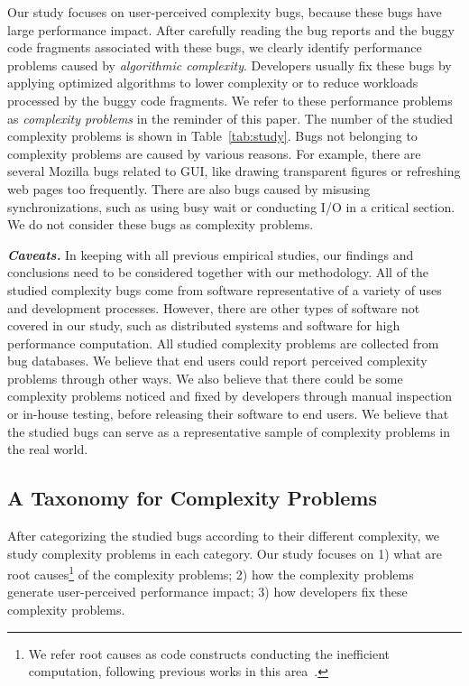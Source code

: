 Our study focuses on user-perceived complexity bugs, 
because these bugs have large performance impact.
After carefully reading the bug reports and the buggy code fragments 
associated with these bugs,
we clearly identify \ComBugs performance problems 
caused by {\textit{algorithmic complexity}}.
Developers usually fix these bugs by applying optimized algorithms to lower complexity
or to reduce workloads processed by the buggy code fragments. 
We refer to these performance problems as 
{\textit{complexity problems}} in the reminder of this paper.
The number of the studied complexity problems is shown in Table~\ref{tab:study}.
Bugs not belonging to complexity problems are caused by various reasons.
For example, there are several Mozilla bugs related to GUI, 
like drawing transparent figures or refreshing web pages too frequently. 
There are also bugs caused by misusing synchronizations, 
such as using busy wait or conducting I/O in a critical section. 
We do not consider these bugs as complexity problems.

{\bf{\textit{Caveats.}}}
In keeping with all previous empirical studies, 
our findings and conclusions need to be considered together with our methodology.
All of the studied complexity bugs come from software representative of a variety of uses and development processes. 
However, there are other types of software not covered in our study, 
such as distributed systems and software for high performance computation. 
All studied complexity problems are collected from bug databases.  
We believe that end users could report perceived complexity problems through other ways.
We also believe that there could be some complexity problems noticed 
and fixed by developers through manual inspection or in-house testing, 
before releasing their software to end users.  
We believe that the studied bugs can serve as a representative sample
of complexity problems in the real world. 



\subsection{A Taxonomy for Complexity Problems}
\label{sec:tax}



After categorizing the studied bugs according to their different complexity, 
we study complexity problems in each category.
Our study focuses on 
1) what are root causes\footnote{We refer root causes as code constructs 
conducting the inefficient computation, 
following previous works in this area~\cite{SongOOPSLA2014,ldoctor}.} 
of the complexity problems;
2) how the complexity problems generate user-perceived performance impact;
3) how developers fix these complexity problems. 

